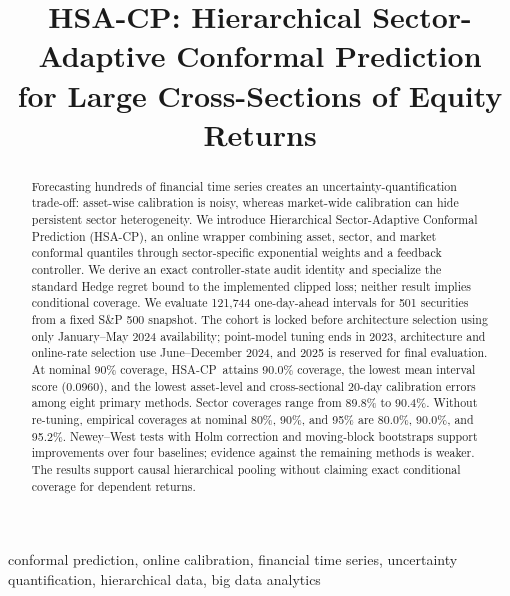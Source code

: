 \documentclass[conference]{IEEEtran}
\newcommand{\method}{HSA-CP}
\begin{document}
\title{HSA-CP: Hierarchical Sector-Adaptive Conformal Prediction\\
for Large Cross-Sections of Equity Returns}

\author{
}

\maketitle

\begin{abstract}
Forecasting hundreds of financial time series creates an uncertainty-quantification trade-off: asset-wise calibration is noisy, whereas market-wide calibration can hide persistent sector heterogeneity. We introduce Hierarchical Sector-Adaptive Conformal Prediction (\method), an online wrapper combining asset, sector, and market conformal quantiles through sector-specific exponential weights and a feedback controller. We derive an exact controller-state audit identity and specialize the standard Hedge regret bound to the implemented clipped loss; neither result implies conditional coverage. We evaluate 121,744 one-day-ahead intervals for 501 securities from a fixed S\&P 500 snapshot. The cohort is locked before architecture selection using only January--May 2024 availability; point-model tuning ends in 2023, architecture and online-rate selection use June--December 2024, and 2025 is reserved for final evaluation. At nominal 90\% coverage, \method\ attains 90.0\% coverage, the lowest mean interval score (0.0960), and the lowest asset-level and cross-sectional 20-day calibration errors among eight primary methods. Sector coverages range from 89.8\% to 90.4\%. Without re-tuning, empirical coverages at nominal 80\%, 90\%, and 95\% are 80.0\%, 90.0\%, and 95.2\%. Newey--West tests with Holm correction and moving-block bootstraps support improvements over four baselines; evidence against the remaining methods is weaker. The results support causal hierarchical pooling without claiming exact conditional coverage for dependent returns.
\end{abstract}

\begin{IEEEkeywords}
conformal prediction, online calibration, financial time series, uncertainty quantification, hierarchical data, big data analytics
\end{IEEEkeywords}
\end{document}
